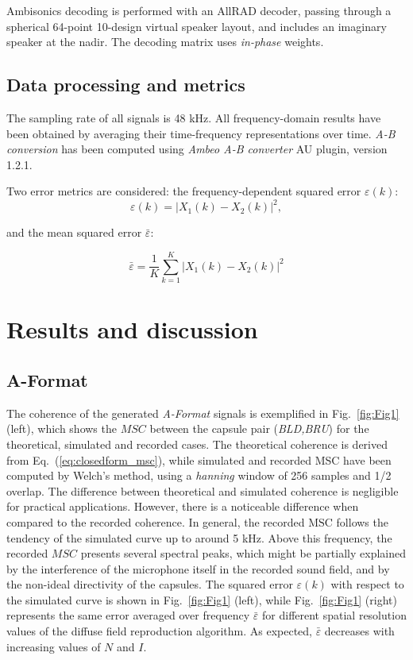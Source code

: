 Ambisonics decoding is performed with an AllRAD decoder, passing through a spherical 64-point 10-design virtual speaker layout, and includes an imaginary speaker at the nadir. The decoding matrix uses \textit{in-phase} weights.



\subsection{Data processing and metrics}

The sampling rate of all signals is 48 kHz.
All frequency-domain results have been obtained by averaging their time-frequency representations over time.  
\textit{A-B conversion} has been computed using \textit{Ambeo A-B converter} AU plugin, version 1.2.1.

Two error metrics are considered: the frequency-dependent squared error $\varepsilon(k)$:
\begin{equation}
	\varepsilon(k) = |X_1(k) - X_2(k)|^2,
	\label{eq:mse}
\end{equation}

 and the mean squared error $\bar{\varepsilon}$:

\begin{equation}
    \bar{\varepsilon} = \frac{1}{K}{\sum_{k=1}^{K} |X_1(k) - X_2(k)|^2}
    \label{eq:nmse}
\end{equation}



\section{Results and discussion}
\subsection{\label{subsec:results_aformat}A-Format}



The coherence of the generated \textit{A-Format} signals is exemplified in Fig.~\ref{fig:Fig1} (left), which shows the $MSC$ between the capsule pair (\textit{BLD,BRU}) for the theoretical, simulated and recorded cases.
The theoretical coherence is derived from Eq.~(\ref{eq:closedform_msc}), while simulated and recorded MSC have been computed by Welch's method, using a \textit{hanning} window of 256 samples and 1/2 overlap.
The difference between theoretical and simulated coherence is negligible for practical applications.
However, there is a noticeable difference when compared to the recorded coherence. 
In general, the recorded $\text{MSC}$ follows the tendency of the simulated curve up to around 5 kHz.
Above this frequency, the recorded $MSC$ presents several spectral peaks, which might be partially explained by the interference of the microphone itself in the recorded sound field, and by the non-ideal directivity of the capsules.
The squared error $\varepsilon(k)$ with respect to the simulated curve is shown in Fig.~\ref{fig:Fig1} (left), while Fig.~\ref{fig:Fig1} (right) represents the same error averaged over frequency $\bar{\varepsilon}$ for different spatial resolution values of the diffuse field reproduction algorithm.
As expected, $\bar{\varepsilon}$ decreases with increasing values of $N$ and $I$.

